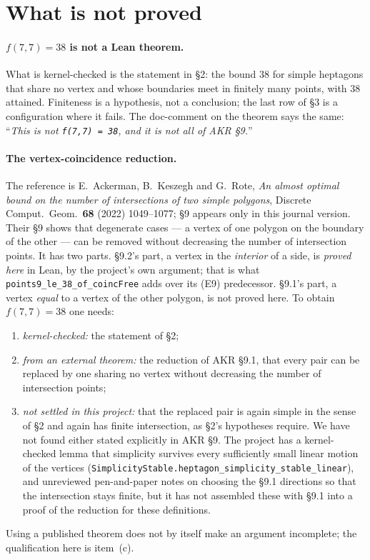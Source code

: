 \documentclass[11pt]{article}
\newcommand{\code}[1]{\texttt{\small #1}}
\begin{document}


\section{What is not proved}\label{sec:notproved}

\paragraph{$f(7,7)=38$ is not a Lean theorem.} What is kernel-checked is the
statement in \S2: the bound $38$ for simple heptagons that share no vertex and
whose boundaries meet in finitely many points, with $38$ attained. Finiteness
is a hypothesis, not a conclusion; the last row of \S3 is a configuration
where it fails. The doc-comment on the theorem says the same: ``\emph{This is
not \code{f(7,7) = 38}, and it is not all of AKR \S9.}''

\paragraph{The vertex-coincidence reduction.} The reference is E.~Ackerman,
B.~Keszegh and G.~Rote, \emph{An almost optimal bound on the number of
intersections of two simple polygons}, Discrete Comput.\ Geom.\ \textbf{68}
(2022) 1049--1077; \S9 appears only in this journal version. Their \S9 shows
that degenerate cases --- a vertex of one polygon on the boundary of the other
--- can be removed without decreasing the number of intersection points. It
has two parts. \S9.2's part, a vertex in the \emph{interior} of a side, is
\emph{proved here} in Lean, by the project's own argument; that is what
\code{points9\_le\_38\_of\_coincFree} adds over its (E9) predecessor. \S9.1's
part, a vertex \emph{equal} to a vertex of the other polygon, is not proved
here. To obtain $f(7,7)=38$ one needs:
\begin{enumerate}
\item[(a)] \emph{kernel-checked:} the statement of \S2;
\item[(b)] \emph{from an external theorem:} the reduction of AKR \S9.1, that
  every pair can be replaced by one sharing no vertex without decreasing the
  number of intersection points;
\item[(c)] \emph{not settled in this project:} that the replaced pair is again
  simple in the sense of \S2 and again has finite intersection, as \S2's
  hypotheses require. We have not found either stated explicitly in AKR \S9.
  The project has a kernel-checked lemma that simplicity survives every
  sufficiently small linear motion of the vertices
  (\code{SimplicityStable.heptagon\_simplicity\_stable\_linear}), and
  unreviewed pen-and-paper notes on choosing the \S9.1 directions so that the
  intersection stays finite, but it has not assembled these with \S9.1 into a
  proof of the reduction for these definitions.
\end{enumerate}
Using a published theorem does not by itself make an argument incomplete;
the qualification here is item~(c).
\end{document}
